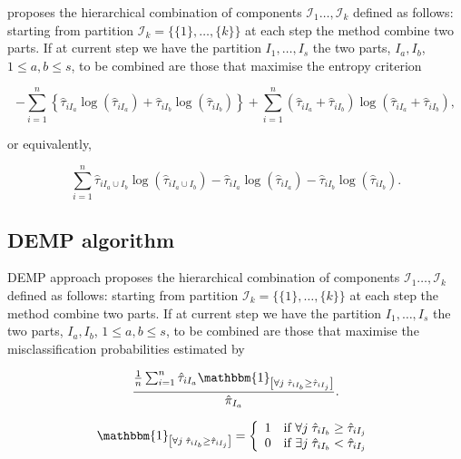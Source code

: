 \documentclass[10pt, a4paper]{article}
\begin{document}
\cite{baudry2010combining} proposes the  hierarchical combination of components  $\mathcal{I}_1 \dots, \mathcal{I}_k$ defined as follows: starting from partition $\mathcal{I}_k = \{\{1\},\dots, \{k\}\}$ at each step the method combine two parts. If at current step we have the partition  $I_1, \dots, I_s$ the two parts, $I_a, I_b$, $1 \leq a,b \leq s$, to be combined are those that maximise the entropy criterion

\[
- \sum_{i=1}^n \left\{ \hat{\tau}_{iI_a} \log(\hat{\tau}_{iI_a}) + \hat{\tau}_{iI_b} \log(\hat{\tau}_{iI_b})\right\} +  \sum_{i=1}^n  (\hat{\tau}_{iI_a}+\hat{\tau}_{iI_b}) \log(\hat{\tau}_{iI_a} + \hat{\tau}_{iI_b}),
\]

or equivalently,

\[
 \sum_{i=1}^n \hat{\tau}_{i I_a \cup I_b} \log(\hat{\tau}_{i I_a \cup I_b}) - \hat{\tau}_{iI_a} \log(\hat{\tau}_{iI_a}) - \hat{\tau}_{iI_b} \log(\hat{\tau}_{iI_b}).
\]


\subsection*{DEMP algorithm}


DEMP approach \citep{hennig2010methods} proposes the hierarchical combination of components  $\mathcal{I}_1 \dots, \mathcal{I}_k$ defined as follows: starting from partition $\mathcal{I}_k = \{\{1\},\dots, \{k\}\}$ at each step the method combine two parts. If at current step we have the partition  $I_1, \dots, I_s$ the two parts, $I_a, I_b$, $1 \leq a,b \leq s$,  to be combined are those that maximise the misclassification probabilities estimated by 

\begin{equation}\label{demp_criteria}
\frac{ \frac{1}{n} \sum_{i=1}^n {\hat{\tau}_{iI_a} \mathbbm{1}_{\left[ \forall j\; \hat{\tau}_{i I_{b}} \geq \hat{\tau}_{iI_j} \right]}}}{ \hat{\pi}_{I_a}}.
\end{equation}

\[
\mathbbm{1}_{\left[ \forall j\; \hat{\tau}_{i I_{b}} \geq \hat{\tau}_{iI_j} \right]} =
\left\{\begin{array}{ll}	
1 & \text{if $\forall j\; \hat{\tau}_{i I_{b}} \geq \hat{\tau}_{iI_j}$}\\
0 & \text{if $\exists j\; \hat{\tau}_{i I_{b}} < \hat{\tau}_{iI_j}$}
\end{array}\right.
\]
\end{document}
